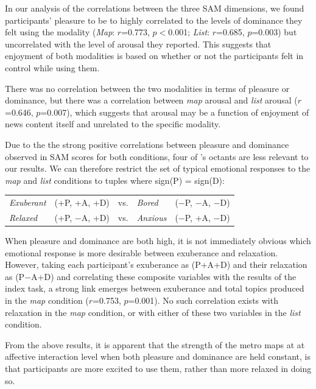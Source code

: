 In our analysis of the correlations between the three SAM dimensions, we found participants' pleasure to be to highly correlated to the levels of dominance they felt using the modality (\textit{Map}: $r$=0.773, $p<$0.001; \textit{List}: $r$=0.685, $p$=0.003) but uncorrelated with the level of arousal they reported. This suggests that enjoyment of both modalities is based on whether or not the participants felt in control while using them.

There was no correlation between the two modalities in terms of pleasure or dominance, but there was a correlation between \textit{map} arousal and \textit{list} arousal ($r$=0.646, $p$=0.007), which suggests that arousal may be a function of enjoyment of news content itself and unrelated to the specific modality.

Due to the the strong positive correlations between pleasure and dominance observed in SAM scores for both conditions, four of \citeauthor{emotionbasedtheory}'s octants are less relevant to our results. We can therefore restrict the set of typical emotional responses to the \textit{map} and \textit{list} conditions to tuples where sign(P) = sign(D):

\begin{table}[htbp!]
\centering
\begin{tabular}{lllll}
\textit{Exuberant} & (+P, +A, +D) & vs. & \textit{Bored} & ($-$P, $-$A, $-$D) \\
\textit{Relaxed} & (+P, $-$A, +D) & vs. & \textit{Anxious} & ($-$P, +A, $-$D) \\
\end{tabular}
\end{table}

When pleasure and dominance are both high, it is not immediately obvious which emotional response is more desirable between exuberance and relaxation. However, taking each participant's exuberance as (P+A+D) and their relaxation as (P$-$A+D) and correlating these composite variables with the results of the index task, a strong link emerges between exuberance and total topics produced in the \textit{map} condition ($r$=0.753, $p$=0.001). No such correlation exists with relaxation in the \textit{map} condition, or with either of these two variables in the \textit{list} condition.

From the above results, it is apparent that the strength of the metro maps at at affective interaction level when both pleasure and dominance are held constant, is that participants are more excited to use them, rather than more relaxed in doing so.



